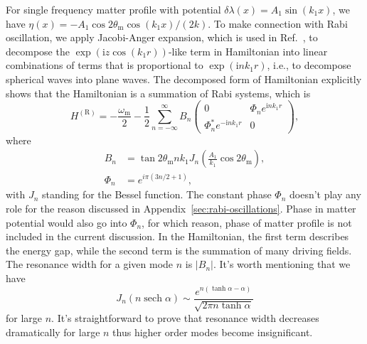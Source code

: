 \documentclass[%
reprint,
 amsmath,amssymb,
 prd,
]{revtex4-1}
\newcommand{\sech}[1]{{\operatorname{sech}{#1}}}
\newcommand{\ri}{\mathrm{i}}
\begin{document}
For single frequency matter profile with potential $\delta\lambda(x) = A_1\sin(k_1x)$, we have $\eta(x) = - A_1 \cos 2\theta_{\mathrm m} \cos (k_1 x)/(2 k) $. To make connection with Rabi oscillation, we apply Jacobi-Anger expansion, which is used in Ref.~, to decompose the $\exp\left( \ri z \cos\left(k_1 r \right) \right)$-like term in Hamiltonian into linear combinations of terms that is proportional to $\exp\left(\ri n k_1 r \right)$, i.e., to decompose spherical waves into plane waves. The decomposed form of Hamiltonian explicitly shows that the Hamiltonian is a summation of Rabi systems, which is
\begin{equation*}
    H^{(\mathrm{R})} = 
    -\frac{\omega_{\mathrm{m}}}{2} 
    -  \frac{1}{2} \sum_{n=-\infty}^\infty B_n \begin{pmatrix}
    0 &  \Phi_n e^{\ri n k_1  r} \\
     \Phi_n^* e^{ - \ri n k_1 r} & 0
    \end{pmatrix},
\end{equation*}
where
\begin{align*}
    B_n &= \tan 2\theta_{\mathrm m} n k_1 J_{n} \left( \frac{A_1}{k_1}\cos 2\theta_{\mathrm m} \right),\\
    \Phi_n &= e^{i\pi (3n/2+1)},
\end{align*}
with $J_n$ standing for the Bessel function.
The constant phase $\Phi_n$ doesn't play any role for the reason discussed in Appendix~\ref{sec:rabi-oscillations}. Phase in matter potential would also go into $\Phi_n$, for which reason, phase of matter profile is not included in the current discussion. In the Hamiltonian, the first term describes the energy gap, while the second term is the summation of many driving fields. The resonance width for a given mode $n$ is $\lvert B_{n}\rvert$. It's worth mentioning that we have~\cite{Ploumistakis20092897}
\begin{equation}
J_n(n \sech \alpha) \sim \frac{ e^{n(\tanh\alpha - \alpha)} }{\sqrt{ 2\pi n \tanh \alpha } }
\end{equation}
for large $n$. It's straightforward to prove that resonance width decreases dramatically for large $n$ thus higher order modes become insignificant.
\end{document}
